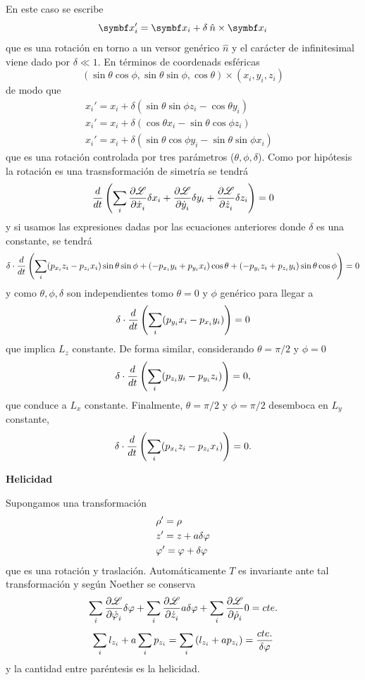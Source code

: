 \documentclass[10pt,oneside]{CBFT_book}
\begin{document}
En este caso se escribe 
\[
	\vb{x}_i' = \vb{x}_i + \delta \: \hat{n}\times\vb{x}_i
\]
que es una rotación en torno a un versor genérico $\hat{n}$ y el carácter de infinitesimal viene dado por $\delta \ll 
1$.
En términos de coordenads esféricas
\[
	(\sin\theta\cos\phi,\sin\theta\sin\phi,\cos\theta)\times (x_i,y_i,z_i)
\]
de modo que 
\begin{eqnarray*}
	x_i' = x_i + \delta( \sin\theta \sin\phi z_i - \cos\theta y_i ) &\\
	x_i' = x_i + \delta( \cos\theta x_i - \sin\theta\cos\phi z_i ) &\\
	x_i' = x_i + \delta( \sin\theta \cos\phi y_i - \sin\theta\sin\phi x_i ) &
\end{eqnarray*}
que es una rotación controlada por tres parámetros ($\theta,\phi,\delta$).
Como por hipótesis la rotación es una trasnsformación de simetría se tendrá
\[
	\frac{d^{\hspace{-0.05em}} {}}{d {t}^{\hspace{-0.05em}}}\left( \sum_i \frac{\partial^{\hspace{-0.05em}} {\mathscr{L}}}{\partial {\dot{x}_i}^{\hspace{-0.05em}}} \delta x_i +  
	\frac{\partial^{\hspace{-0.05em}} {\mathscr{L}}}{\partial {\dot{y}_i}^{\hspace{-0.05em}}} \delta y_i +
	\frac{\partial^{\hspace{-0.05em}} {\mathscr{L}}}{\partial {\dot{z}_i}^{\hspace{-0.05em}}} \delta z_i \right) = 0
\]
y si usamos las expresiones dadas por las ecuaciones anteriores donde $\delta$ es una constante, se tendrá
\[
	\delta \cdot \frac{d^{\hspace{-0.05em}} {}}{d {t}^{\hspace{-0.05em}}}\left( \sum_i ( p_{x_i} z_i - p_{z_i}x_i )\sin\theta\sin\phi + 
	( -p_{x_i} y_i + p_{y_i} x_i )\cos\theta + ( -p_{y_i} z_i + p_{z_i} y_i )\sin\theta\cos\phi \right) = 0
\]
y como $\theta,\phi,\delta$ son independientes tomo $\theta=0$ y $\phi$ genérico para llegar a
\[
	\delta \cdot \frac{d^{\hspace{-0.05em}} {}}{d {t}^{\hspace{-0.05em}}}\left( \sum_i ( p_{y_i} x_i - p_{x_i} y_i ) \right) = 0
\]
que implica $L_z$ constante. De forma similar, considerando $\theta=\pi/2$ y $\phi=0$
\[
	\delta \cdot \frac{d^{\hspace{-0.05em}} {}}{d {t}^{\hspace{-0.05em}}}\left( \sum_i ( p_{z_i} y_i - p_{y_i} z_i ) \right) = 0,
\]
que conduce a $L_x$ constante. Finalmente, $\theta=\pi/2$ y $\phi=\pi/2$ desemboca en $L_y$ constante,
\[
	\delta \cdot \frac{d^{\hspace{-0.05em}} {}}{d {t}^{\hspace{-0.05em}}}\left( \sum_i ( p_{x_i} z_i - p_{z_i} x_i ) \right) = 0.
\]


\begin{ejemplo}{\bf Helicidad}

Supongamos una transformación
\begin{eqnarray*}
	&\rho' = \rho \\
	&z' = z + a \delta \varphi \\
	&\varphi' = \varphi + \delta\varphi 
\end{eqnarray*}
que es una rotación y traslación. Automáticamente $T$ es invariante ante tal transformación y según Noether se conserva
\[
	\sum_i \frac{\partial^{\hspace{-0.05em}} {\mathscr{L}}}{\partial {\dot{\varphi}_i}^{\hspace{-0.05em}}} \delta \varphi + \sum_i \frac{\partial^{\hspace{-0.05em}} {\mathscr{L}}}{\partial {\dot{z}_i}^{\hspace{-0.05em}}} a \delta \varphi +
	\sum_i \frac{\partial^{\hspace{-0.05em}} {\mathscr{L}}}{\partial {\dot{\rho}_i}^{\hspace{-0.05em}}} 0 = cte.
\]
\[
	\sum_i l_{z_i} + a \sum_i p_{z_i}  = \sum_i \left( l_{z_i} + a p_{z_i} \right) = \frac{cte. }{\delta \varphi}
\]
y la cantidad entre paréntesis es la helicidad.
\end{ejemplo}
\end{document}

